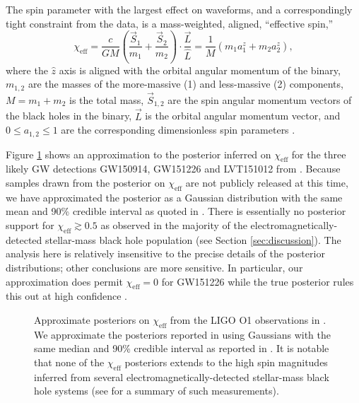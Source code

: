 \documentclass[modern,linenumbers]{aastex61}
\newcommand{\chieff}{\chi_\mathrm{eff}}
\begin{document}
The spin parameter with the largest effect on waveforms, and a
correspondingly tight constraint from the data, is a mass-weighted,
aligned, ``effective spin,''
\begin{equation}
  \chieff = \frac{c}{GM} \left( \frac{\vec{S}_1}{m_1} + \frac{\vec{S}_2}{m_2}
  \right) \cdot \frac{\vec{L}}{\hat{L}} = \frac{1}{M} \left( m_1 a_1^z + m_2 a_2^z \right),
\end{equation}
where the $\hat{z}$ axis is aligned with the orbital angular momentum
of the binary, $m_{1,2}$ are the masses of the more-massive (1) and
less-massive (2) components, $M = m_1 + m_2$ is the total mass,
$\vec{S}_{1,2}$ are the spin angular momentum vectors of the black
holes in the binary, $\vec{L}$ is the orbital angular momentum vector,
and $0 \leq a_{1,2} \leq 1$ are the corresponding dimensionless spin
parameters \citep{2016PhRvL.116x1102A}.

Figure \ref{fig:O1-posteriors} shows an approximation to the posterior
inferred on $\chieff$ for the three likely \ac{GW} detections
GW150914, GW151226 and LVT151012 from \citet{O1-BBH}.  Because samples
drawn from the posterior on $\chieff$ are not publicly released at
this time, we have approximated the posterior as a Gaussian
distribution with the same mean and 90\% credible interval as quoted
in \citet{O1-BBH}.  There is essentially no posterior support for
$\chieff \gtrsim 0.5$ as observed in the majority of the
electromagnetically-detected stellar-mass black hole population (see
Section \ref{sec:discussion}).  The analysis here is relatively
insensitive to the precise details of the posterior distributions;
other conclusions are more sensitive.  In particular, our
approximation does permit $\chieff = 0$ for GW151226 while the true
posterior rules this out at high confidence
\citep{2016PhRvL.116x1103A,O1-BBH}.

\begin{figure}
  \caption{\label{fig:O1-posteriors} Approximate posteriors on
    $\chieff$ from the LIGO O1 observations in \citet{O1-BBH}.  We
    approximate the posteriors reported in \citet{O1-BBH} using
    Gaussians with the same median and 90\% credible interval as
    reported in \citet{O1-BBH}.  It is notable that none of the
    $\chieff$ posteriors extends to the high spin magnitudes inferred
    from several electromagnetically-detected stellar-mass black hole
    systems (see \citet{2015PhR...548....1M} for a summary of such
    measurements).}
\end{figure}
\end{document}
